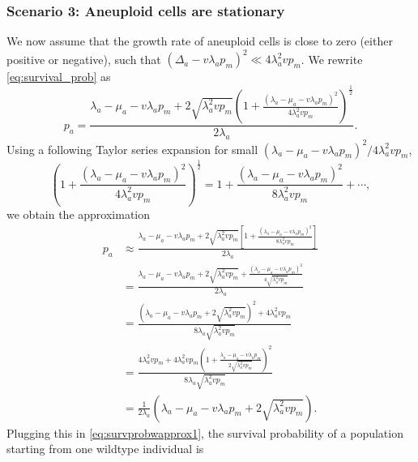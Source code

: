 \documentclass[12pt]{extarticle}
\begin{document}
\begin{appendices}
\subsubsection*{Scenario 3: Aneuploid cells are stationary} %

We now assume that the growth rate of aneuploid cells is close to zero (either positive or negative), such that  $\left(\Delta_a-v\lambda_ap_m\right)^2 \ll 4\lambda_a^2vp_m$.
We rewrite \cref{eq:survival_prob} as
\begin{equation}
p_a = \frac{\lambda_a-\mu_a-v\lambda_ap_m+2\sqrt{\lambda_a^2 vp_m}\left(1+\frac{\left(\lambda_a-\mu_a-v\lambda_ap_m\right)^2}{4\lambda_a^2vp_m}\right)^{\frac12}}{2\lambda_a} .
\end{equation}
Using a following Taylor series expansion for small $\left(\lambda_a-\mu_a-v\lambda_ap_m\right)^2 / 4\lambda_a^2vp_m$,
\begin{equation*}
\left(1+\frac{\left(\lambda_a-\mu_a-v\lambda_ap_m\right)^2}{4\lambda_a^2vp_m}\right)^{\frac{1}{2}}=1+\frac{\left(\lambda_a-\mu_a-v\lambda_ap_m\right)^2}{8\lambda_a^2vp_m}+\cdots,
\end{equation*}
we obtain the approximation
\begin{equation}
\begin{aligned}
p_a&\approx\frac{\lambda_a-\mu_a-v\lambda_ap_m+2\sqrt{\lambda_a^2 vp_m}\left[1+\frac{\left(\lambda_a-\mu_a-v\lambda_ap_m\right)^2}{8\lambda_a^2vp_m}\right]}{2\lambda_a}\\
&=\frac{\lambda_a-\mu_a-v\lambda_ap_m+2\sqrt{\lambda_a^2 vp_m}+\frac{\left(\lambda_a-\mu_a-v\lambda_ap_m\right)^2}{4\sqrt{\lambda_a^2vp_m}}}{2\lambda_a}\\
&=\frac{\left(\lambda_a-\mu_a-v\lambda_ap_m+2\sqrt{\lambda_a^2vp_m}\right)^2+4\lambda_a^2vp_m}{8\lambda_a\sqrt{\lambda_a^2vp_m}}\\
&=\frac{4\lambda_a^2vp_m+4\lambda_a^2vp_m\left(1+\frac{\lambda_a-\mu_a-v\lambda_ap_m}{2\sqrt{\lambda_a^2vp_m}}\right)^2}{8\lambda_a\sqrt{\lambda_a^2vp_m}}\\
&=\frac{1}{2\lambda_a}\left(\lambda_a-\mu_a-v\lambda_ap_m+2\sqrt{\lambda_a^2vp_m}\right).
\end{aligned}
\end{equation}
Plugging this in \cref{eq:survprobwapprox1}, the survival probability of a population starting from one wildtype individual is
\begin{equation}\label{eq:scenario3}
\begin{aligned}

\end{aligned}
\end{equation}
\end{appendices}
\end{document}
